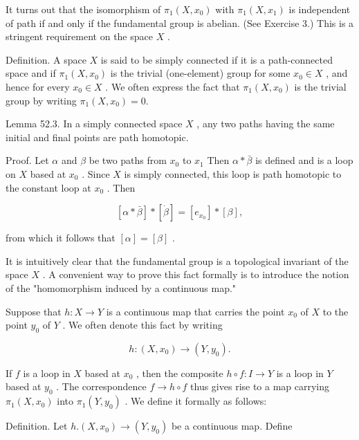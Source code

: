 It turns out that the isomorphism of \({\pi }_{1}\left( {X,{x}_{0}}\right)\) with \({\pi }_{1}\left( {X,{x}_{1}}\right)\) is independent of path if and only if the fundamental group is abelian. (See Exercise 3.) This is a stringent requirement on the space \(X\) .

Definition. A space \(X\) is said to be simply connected if it is a path-connected space and if \({\pi }_{1}\left( {X,{x}_{0}}\right)\) is the trivial (one-element) group for some \({x}_{0} \in  X\) , and hence for every \({x}_{0} \in  X\) . We often express the fact that \({\pi }_{1}\left( {X,{x}_{0}}\right)\) is the trivial group by writing \({\pi }_{1}\left( {X,{x}_{0}}\right)  = 0.\)

Lemma 52.3. In a simply connected space \(X\) , any two paths having the same initial and final points are path homotopic.

Proof. Let \(\alpha\) and \(\beta\) be two paths from \({x}_{0}\) to \({x}_{1}\) Then \(\alpha  * \bar{\beta }\) is defined and is a loop on \(X\) based at \({x}_{0}\) . Since \(X\) is simply connected, this loop is path homotopic to the constant loop at \({x}_{0}\) . Then

\[
\left\lbrack  {\alpha  * \bar{\beta }}\right\rbrack   * \left\lbrack  \dot{\beta }\right\rbrack   = \left\lbrack  {e}_{{x}_{0}}\right\rbrack   * \left\lbrack  \beta \right\rbrack  ,
\]

from which it follows that \(\left\lbrack  \alpha \right\rbrack   = \left\lbrack  \beta \right\rbrack\) .

It is intuitively clear that the fundamental group is a topological invariant of the space \(X\) . A convenient way to prove this fact formally is to introduce the notion of the "homomorphism induced by a continuous map."

Suppose that \(h : X \rightarrow  Y\) is a continuous map that carries the point \({x}_{0}\) of \(X\) to the point \({y}_{0}\) of \(Y\) . We often denote this fact by writing

\[
h : \left( {X,{x}_{0}}\right)  \rightarrow  \left( {Y,{y}_{0}}\right) .
\]

If \(f\) is a loop in \(X\) based at \({x}_{0}\) , then the composite \(h \circ  f : I \rightarrow  Y\) is a loop in \(Y\) based at \({y}_{0}\) . The correspondence \(f \rightarrow  h \circ  f\) thus gives rise to a map carrying \({\pi }_{1}\left( {X,{x}_{0}}\right)\) into \({\pi }_{1}\left( {Y,{y}_{0}}\right)\) . We define it formally as follows:

Definition. Let \(h.\left( {X,{x}_{0}}\right)  \rightarrow  \left( {Y,{y}_{0}}\right)\) be a continuous map. Define

